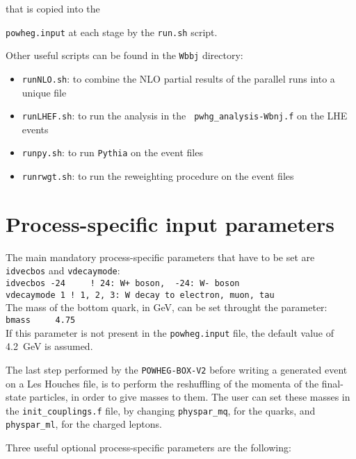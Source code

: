 \documentclass[paper]{JHEP3}
\newcommand\POWHEGBOXV{{\tt POWHEG-BOX-V2}}
\begin{document}
that is copied into the {{\tt powheg.input} at each stage by the {\tt run.sh}
  script.

Other useful scripts can be found in the {\tt Wbbj} directory:
\begin{itemize}
\item {\tt runNLO.sh}: to combine the NLO partial results of the parallel
  runs into a unique file

\item {\tt runLHEF.sh}: to run the analysis in the {\tt
  pwhg\_analysis-Wbnj.f} on the LHE events

\item {\tt runpy.sh}: to run {\tt Pythia} on the event files

\item {\tt runrwgt.sh}: to run the reweighting procedure on the event files

\end{itemize}




\section{Process-specific input parameters}


\noindent The main mandatory process-specific parameters that have to be set are {\tt idvecbos} and {\tt vdecaymode}:\\
{\tt idvecbos -24 \,\,\, \quad ! 24: W+ boson, \   -24: W- boson}\\
{\tt vdecaymode  1 \quad \quad ! 1, 2, 3: W decay to electron, muon, tau}\\


\noindent The mass of the bottom quark, in GeV,  can be set throught the
parameter:\\ 
{\tt bmass \quad \,\,\, 4.75}\\
\noindent If this parameter is not present in the {\tt powheg.input} file,
the default value of 4.2~GeV is assumed.

\noindent The last step performed by the \POWHEGBOXV{} before writing a
generated event on a Les Houches file, is to perform the reshuffling of the
momenta of the final-state particles, in order to give masses to them.  The
user can set these masses in the {\tt init\_couplings.f} file, by changing
{\tt physpar\_mq}, for the quarks, and {\tt physpar\_ml}, for the
charged leptons.\newpage

\noindent Three useful optional process-specific  parameters are the following:

}
\end{document}
